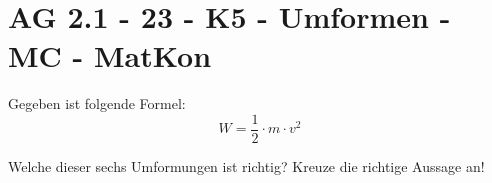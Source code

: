 \section{AG 2.1 - 23 - K5 - Umformen - MC - MatKon}

\begin{beispiel}[AG 2.1]{1}
Gegeben ist folgende Formel:
$$W=\dfrac{1}{2}\cdot m\cdot v^2$$

Welche dieser sechs Umformungen ist richtig? Kreuze die richtige Aussage
an!

\end{beispiel}